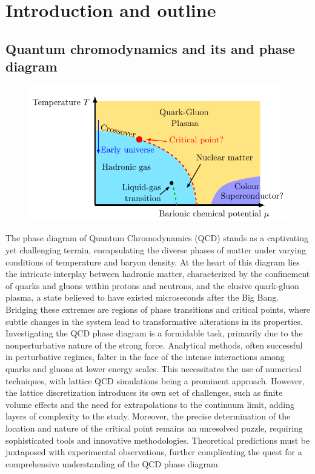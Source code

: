 \chapter{Introduction and outline}
\label{chap:introduction}

\section{Quantum chromodynamics and its and phase diagram}
\begin{figure}[htp]
    \centering 
    \includegraphics[scale=1.0]{figures/phase_diagram.pdf}
    \caption{}
    \label{fig:QCD_phase_diagram}
\end{figure}
The phase diagram of Quantum Chromodynamics (QCD) stands as a captivating yet challenging terrain, encapsulating the diverse phases of matter under varying conditions of temperature and baryon density. At the heart of this diagram lies the intricate interplay between hadronic matter, characterized by the confinement of quarks and gluons within protons and neutrons, and the elusive quark-gluon plasma, a state believed to have existed microseconds after the Big Bang. Bridging these extremes are regions of phase transitions and critical points, where subtle changes in the system lead to transformative alterations in its properties.
Investigating the QCD phase diagram is a formidable task, primarily due to the nonperturbative nature of the strong force. Analytical methods, often successful in perturbative regimes, falter in the face of the intense interactions among quarks and gluons at lower energy scales. This necessitates the use of numerical techniques, with lattice QCD simulations being a prominent approach. However, the lattice discretization introduces its own set of challenges, such as finite volume effects and the need for extrapolations to the continuum limit, adding layers of complexity to the study.
Moreover, the precise determination of the location and nature of the critical point remains an unresolved puzzle, requiring sophisticated tools and innovative methodologies. Theoretical predictions must be juxtaposed with experimental observations, further complicating the quest for a comprehensive understanding of the QCD phase diagram.
